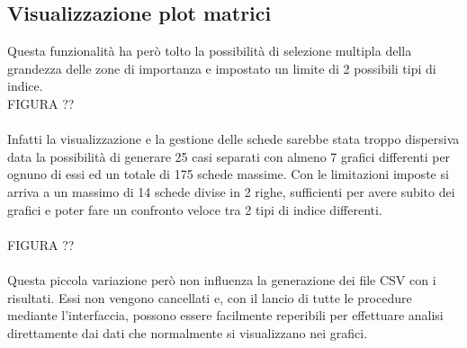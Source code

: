 \subsection{Visualizzazione plot matrici}
Questa funzionalit\`a ha per\`o tolto la possibilit\`a di selezione multipla della grandezza delle zone di importanza
e impostato un limite di 2 possibili tipi di indice.
\\
FIGURA ??\\
\\
Infatti la visualizzazione e la gestione delle schede sarebbe stata troppo dispersiva data la possibilit\`a di
generare 25 casi separati con almeno 7 grafici differenti per ognuno di essi ed un totale di 175 schede massime.
Con le limitazioni imposte si arriva a un massimo di 14 schede divise in 2 righe, sufficienti per avere subito
dei grafici e poter fare un confronto veloce tra 2 tipi di indice differenti.\\
\\
FIGURA ??\\
\\
Questa piccola variazione per\`o non influenza la generazione dei file CSV con i risultati. Essi non vengono cancellati
e, con il lancio di tutte le procedure mediante l'interfaccia, possono essere facilmente reperibili per effettuare
analisi direttamente dai dati che normalmente si visualizzano nei grafici.
